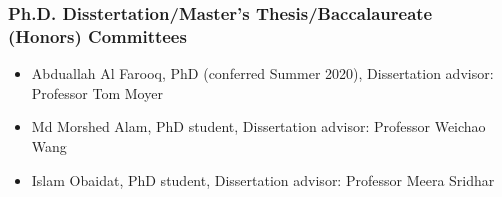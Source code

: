 \hypertarget{thesis-committees}{%
\subsubsection{Ph.D. Disstertation/Master's Thesis/Baccalaureate (Honors) Committees}\label{thesis-committees}}
\begin{itemize}
\item Abduallah Al Farooq, PhD (conferred Summer 2020), Dissertation advisor: Professor Tom Moyer
\item Md Morshed Alam, PhD student, Dissertation advisor: Professor Weichao Wang
\item Islam Obaidat, PhD student, Dissertation advisor: Professor Meera Sridhar
\end{itemize}

